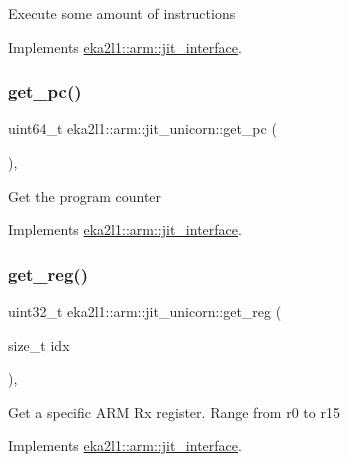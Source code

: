 Execute some amount of instructions 

Implements \mbox{\hyperlink{classeka2l1_1_1arm_1_1jit__interface_a6dbaf8bc64fd987c3b1d96f2644c3811}{eka2l1\+::arm\+::jit\+\_\+interface}}.

\mbox{\label{classeka2l1_1_1arm_1_1jit__unicorn_a8429f8e0e5aafa264929336aaafc2e24}} 
\subsubsection{\texorpdfstring{get\+\_\+pc()}{get\_pc()}}
{\footnotesize\ttfamily uint64\+\_\+t eka2l1\+::arm\+::jit\+\_\+unicorn\+::get\+\_\+pc (\begin{DoxyParamCaption}{ }\end{DoxyParamCaption})\hspace{0.3cm}{\ttfamily [override]}, {\ttfamily [virtual]}}

Get the program counter 

Implements \mbox{\hyperlink{classeka2l1_1_1arm_1_1jit__interface_a89fd7fc20ee959606a71eecb959c610d}{eka2l1\+::arm\+::jit\+\_\+interface}}.

\mbox{\label{classeka2l1_1_1arm_1_1jit__unicorn_a94a0495c63ad80defc3afd71b7a89d04}} 
\subsubsection{\texorpdfstring{get\+\_\+reg()}{get\_reg()}}
{\footnotesize\ttfamily uint32\+\_\+t eka2l1\+::arm\+::jit\+\_\+unicorn\+::get\+\_\+reg (\begin{DoxyParamCaption}\item[{size\+\_\+t}]{idx }\end{DoxyParamCaption})\hspace{0.3cm}{\ttfamily [override]}, {\ttfamily [virtual]}}

Get a specific A\+RM Rx register. Range from r0 to r15 

Implements \mbox{\hyperlink{classeka2l1_1_1arm_1_1jit__interface_ae68ac4dc5fdb598d36aef40689694f6b}{eka2l1\+::arm\+::jit\+\_\+interface}}.

